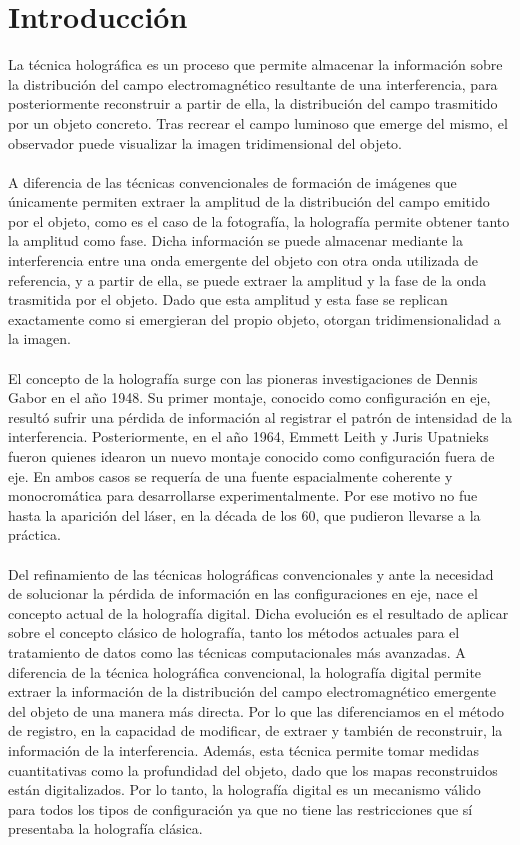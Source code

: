 \documentclass[12pt]{article}
\begin{document}
\section{Introducción}
La técnica holográfica es un proceso que permite almacenar la información sobre la distribución del campo electromagnético resultante de una interferencia, para posteriormente  reconstruir a partir de ella, la distribución del campo  trasmitido por un objeto concreto. Tras recrear el campo luminoso  que emerge del mismo, el observador puede visualizar la imagen  tridimensional del objeto. \\ \\ 
A diferencia de las técnicas convencionales de formación de imágenes que únicamente permiten extraer la amplitud de la  distribución del campo emitido por el objeto, como es el caso de la fotografía, la holografía permite obtener tanto la amplitud como fase. Dicha información se puede almacenar mediante la interferencia entre una onda emergente del objeto con otra onda utilizada de referencia, y a partir de ella, se puede extraer la amplitud y la fase de la onda trasmitida por el objeto. Dado que esta amplitud y esta fase se replican exactamente como si emergieran del propio objeto, otorgan tridimensionalidad a la imagen.\\ \\
El concepto de la holografía surge con las pioneras investigaciones de Dennis Gabor \cite{1} en el año 1948. Su primer montaje, conocido como  configuración en eje,  resultó sufrir una pérdida de información al registrar el patrón de intensidad de la interferencia. Posteriormente, en el año 1964,  Emmett Leith y Juris Upatnieks \cite{2} fueron quienes idearon un nuevo montaje conocido como configuración fuera de eje. En ambos casos se requería de una fuente espacialmente coherente y monocromática para  desarrollarse experimentalmente. Por ese motivo no fue  hasta  la aparición del láser, en la década de los 60, que pudieron llevarse a la práctica. \\ \\
Del refinamiento de las técnicas holográficas convencionales  y ante la necesidad de solucionar la pérdida de información en las configuraciones en eje, nace el concepto actual de la holografía digital. Dicha evolución es el resultado de aplicar sobre el concepto clásico de holografía,  tanto los métodos actuales para el tratamiento de datos como las técnicas computacionales más avanzadas. A diferencia de la técnica holográfica  convencional, la holografía digital permite extraer  la  información  de  la distribución del campo electromagnético emergente del objeto de una manera más directa. Por lo que las diferenciamos  en el método de registro, en la capacidad de modificar, de extraer y también de reconstruir, la información de la interferencia.  Además, esta técnica permite tomar medidas cuantitativas como la profundidad del objeto, dado que los mapas reconstruidos están digitalizados. Por lo tanto, la holografía digital es un mecanismo válido para todos los tipos de configuración ya que no tiene las restricciones que sí presentaba la holografía clásica.\\ \\ 
\end{document}
